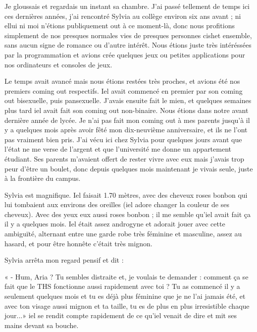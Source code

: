 \documentclass[12pt,hidelinks,a4paper]{book}
\renewcommand{\cdot}{\textperiodcentered}
\begin{document}
\bigskip

Je gloussais et regardais un instant sa chambre. J'ai passé tellement
de temps ici ces dernières années, j'ai rencontré Sylvia au collège
environ six ans avant ; ni ellui ni moi n'étions publiquement out
à ce moment-là, donc nous profitions simplement de nos presques normales
vies de presques personnes cishet ensemble, sans aucun signe de romance
ou d'autre intérêt. Nous étions juste très intéréssé\cdot es par la programmation
et avions crée quelques jeux ou petites applications pour nos ordinateurs
et consoles de jeux.

\bigskip

Le temps avait avancé mais nous étions resté\cdot es très proches, et avions
été nos premiers coming out respectifs. Iel avait commencé en premier
par son coming out bisexuel\cdot le, puis pansexuel\cdot le. J'avais ensuite
fait le mien, et quelques semaines plus tard iel avait fait son coming
out non-binaire. Nous étions dans notre avant dernière année de lycée.
Je n'ai pas fait mon coming out à mes parents jusqu'à il y a quelques
mois après avoir fêté mon dix-neuvième anniversaire, et ils ne l'ont
pas vraiment bien pris. J'ai vécu ici chez Sylvia pour quelques jours
avant que l'état ne me verse de l'argent et que l'université me donne
un appartement étudiant. Ses parents m'avaient offert de rester vivre
avec eux mais j'avais trop peur d'être un boulet, donc depuis quelques
mois maintenant je vivais seule, juste à la frontière du campus.

\bigskip

Sylvia est magnifique. Iel faisait 1.70 mètres, avec des cheveux roses
bonbon qui lui tombaient aux environs des oreilles (iel adore changer
la couleur de ses cheveux). Avec des yeux eux aussi roses bonbon ;
il me semble qu'iel avait fait ça il y a quelques mois. Iel était
assez androgyne et adorait jouer avec cette ambiguïté, alternant entre
une garde robe très féminine et masculine, assez au hasard, et pour
être honnête c'était très mignon.

\bigskip

Sylvia arrêta mon regard pensif et dit :

« - Hum, Aria ? Tu sembles distraite et, je voulais te demander :
comment ça se fait que le THS fonctionne aussi rapidement avec toi
? Tu as commencé il y a seulement quelques mois et tu es déjà plus
féminine que je ne l'ai jamais été, et avec ton visage aussi mignon
et ta taille, tu es de plus en plus irresistible chaque jour...»
iel se rendit compte rapidement de ce qu'iel venait de dire et mit
ses mains devant sa bouche.
\end{document}
